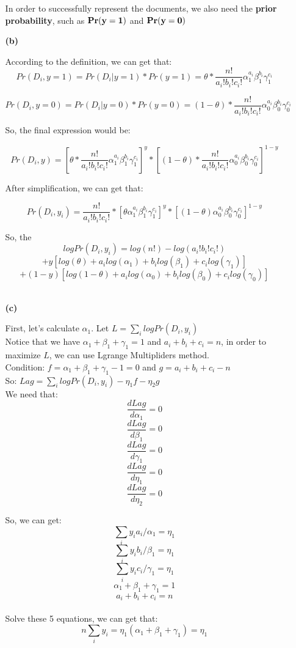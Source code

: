 \begin{enumerate}
\begin{enumerate}
In order to successfully represent the documents, we also need the {\bf prior probability}, such as $\bf Pr(y=1)$ and $\bf Pr(y=0)$\\

\item[{\bf (b)}]

According to the definition, we can get that:
$$Pr(D_i, y=1) = Pr(D_i|y=1)*Pr(y=1) = \theta * \frac{n!}{a_i! b_i! c_i!} \alpha_1^{a_i} \beta_1^{b_i} \gamma_1^{c_i}$$

$$Pr(D_i, y=0) = Pr(D_i|y=0)*Pr(y=0) = (1-\theta) * \frac{n!}{a_i! b_i! c_i!} \alpha_0^{a_i} \beta_0^{b_i} \gamma_0^{c_i}$$

So, the final expression would be:

$$Pr(D_i, y) = [\theta * \frac{n!}{a_i! b_i! c_i!} \alpha_1^{a_i} \beta_1^{b_i} \gamma_1^{c_i}]^y*[(1-\theta) * \frac{n!}{a_i! b_i! c_i!} \alpha_0^{a_i} \beta_0^{b_i} \gamma_0^{c_i}]^{1-y}$$

After simplification, we can get that:

$$Pr(D_i, y_i) = \frac{n!}{a_i! b_i! c_i!} * [\theta \alpha_1^{a_i} \beta_1^{b_i} \gamma_1^{c_i}]^y*[(1-\theta)\alpha_0^{a_i} \beta_0^{b_i} \gamma_0^{c_i}]^{1-y}$$

So, the 
$$logPr(D_i, y_i) = log(n!) - log(a_i! b_i! c_i!)$$
$$ + y[log(\theta) + a_ilog(\alpha_1)+b_ilog(\beta_1)+c_ilog(\gamma_1)] $$
$$+ (1-y)[log(1-\theta) + a_ilog(\alpha_0)+b_ilog(\beta_0)+c_ilog(\gamma_0)]$$\\

\item[{\bf (c)}]

First, let's calculate $\alpha_1$. Let $L = \sum_i logPr(D_i, y_i)$\\

Notice that we have $\alpha_1 + \beta_1 + \gamma_1 = 1$ and $a_i + b_i + c_i = n$, in order to maximize $L$, we can use Lgrange Multipliders method.\\

Condition: $f = \alpha_1 + \beta_1 + \gamma_1 - 1 = 0$ and $g = a_i + b_i + c_i - n$\\

So: $Lag = \sum_i logPr(D_i, y_i) - \eta_1 f - \eta_2 g$\\

We need that:
$$\frac{d Lag }{d\alpha_1} = 0$$
$$\frac{d Lag  }{d\beta_1} = 0$$
$$\frac{d Lag }{d\gamma_1} = 0$$
$$\frac{d Lag }{d\eta_1} = 0$$
$$\frac{d Lag }{d\eta_2} = 0$$

So, we can get:
$$\sum_i y_i a_i /\alpha_1 = \eta_1$$
$$\sum_i y_i b_i /\beta_1 = \eta_1$$
$$\sum_i y_i c_i /\gamma_1 = \eta_1$$
$$\alpha_1 + \beta_1 + \gamma_1 = 1$$
$$a_i + b_i + c_i = n$$\\
Solve these 5 equations, we can get that:\\
$$n\sum_i y_i = \eta_1 (\alpha_1 + \beta_1 + \gamma_1) = \eta_1$$


\end{enumerate}
\end{enumerate}

